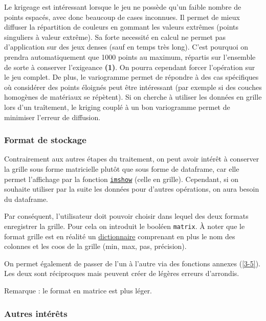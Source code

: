 \documentclass[12pt]{article}
\begin{document}
    Le krigeage est intéressant lorsque le jeu ne possède qu'un faible nombre de points espacés, avec donc beaucoup de cases inconnues. Il permet de mieux diffuser la répartition de couleurs en gommant les valeurs extrêmes (points singuliers à valeur extrême). Sa forte necessité en calcul ne permet pas d'application sur des jeux denses (sauf en temps très long). C'est pourquoi on prendra automatiquement que 1000 points au maximum, répartis sur l'ensemble de sorte à conserver l'exigeance \textbf{(1)}. On pourra cependant forcer l'opération sur le jeu complet. De plus, le variogramme permet de répondre à des cas spécifiques où considérer des points éloignés peut être intéressant (par exemple si des couches homogènes de matériaux se répètent). Si on cherche à utiliser les données en grille lors d'un traîtement, le kriging couplé à un bon variogramme permet de minimiser l'erreur de diffusion.

\subsubsection{Format de stockage}

    Contrairement aux autres étapes du traitement, on peut avoir intérêt à conserver la grille sous forme matricielle plutôt que sous forme de dataframe, car elle permet l'affichage par la fonction \href{https://matplotlib.org/stable/api/_as_gen/matplotlib.pyplot.imshow.html}{\texttt{imshow}} (celle en grille). Cependant, si on souhaite utiliser par la suite les données pour d'autres opérations, on aura besoin du dataframe.

    Par conséquent, l'utilisateur doit pouvoir choisir dans lequel des deux formats enregistrer la grille. Pour cela on introduit le booléen \texttt{matrix}. À noter que le format grille est en réalité un \href{https://docs.python.org/3/tutorial/datastructures.html#dictionaries}{dictionnaire} comprenant en plus le nom des colonnes et les coos de la grille (min, max, pas, précision).

    On permet également de passer de l'un à l'autre via des fonctions annexes (\ref{3-5}). Les deux sont réciproques mais peuvent créer de légères erreurs d'arrondis.

    Remarque : le format en matrice est plus léger.

\subsubsection{Autres intérêts}
\end{document}
